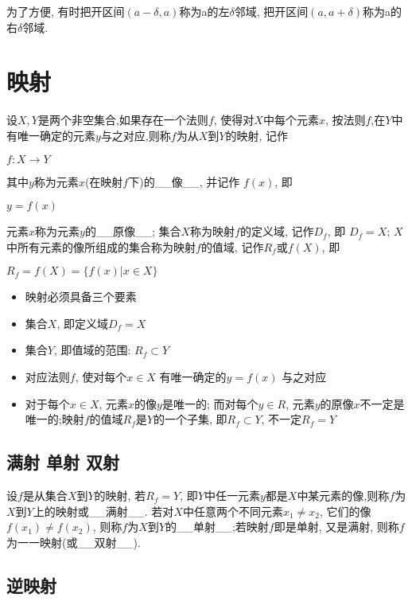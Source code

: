 \documentclass[11pt]{article}
\providecommand{\tightlist}{%
      \setlength{\itemsep}{0pt}\setlength{\parskip}{0pt}}
\begin{document}
为了方便, 有时把开区间\((a - \delta, a)\)称为a的左\(\delta\)邻域,
把开区间\((a, a+ \delta)\)称为a的右\(\delta\)邻域.

\section{映射}\label{ux6620ux5c04}

设\(X, Y\)是两个非空集合,如果存在一个法则\(f\),
使得对\(X\)中每个元素\(x\),
按法则\(f\),在\(Y\)中有唯一确定的元素\(y\)与之对应,则称\(f\)为从\(X\)到\(Y\)的映射,
记作

\(f : X \rightarrow Y\)

其中\(y\)称为元素\(x\)(在映射\(f\)下)的\_\_像\_\_, 并记作 \(f(x)\), 即

\(y = f(x)\)

元素\(x\)称为元素\(y\)的\_\_原像\_\_; 集合\(X\)称为映射\(f\)的定义域,
记作\(D_{f}\), 即 \(D_{f}=X\);
\(X\)中所有元素的像所组成的集合称为映射\(f\)的值域,
记作\(R_{f}\)或\(f(X)\), 即

\(R_{f}=f(X)=\{f(x) | x \in X\}\)

\begin{itemize}
\tightlist
\item
  映射必须具备三个要素
\item
  集合\(X\), 即定义域\(D_{f} = X\)
\item
  集合\(Y\), 即值域的范围: \(R_{f} \subset Y\)
\item
  对应法则\(f\), 使对每个\(x \in X\) 有唯一确定的\(y = f(x)\) 与之对应
\item
  对于每个\(x \in X\), 元素\(x\)的像\(y\)是唯一的; 而对每个\(y \in R\),
  元素\(y\)的原像\(x\)不一定是唯一的;映射\(f\)的值域\(R_{f}\)是\(Y\)的一个子集,
  即\(R_{f} \subset Y\), 不一定\(R_{f} = Y\)
\end{itemize}

\subsection{满射 单射
双射}\label{ux6ee1ux5c04-ux5355ux5c04-ux53ccux5c04}

设\(f\)是从集合\(X\)到\(Y\)的映射, 若\(R_{f} = Y\),
即\(Y\)中任一元素\(y\)都是\(X\)中某元素的像,则称\(f\)为\(X\)到\(Y\)上的映射或\_\_满射\_\_.
若对\(X\)中任意两个不同元素\(x_{1} \ne x_{2}\),
它们的像\(f(x_{1}) \ne f(x_{2})\),
则称\(f\)为\(X\)到\(Y\)的\_\_单射\_\_;若映射\(f\)即是单射, 又是满射,
则称\(f\)为一一映射(或\_\_双射\_\_).

\subsection{逆映射}\label{ux9006ux6620ux5c04}
\end{document}
